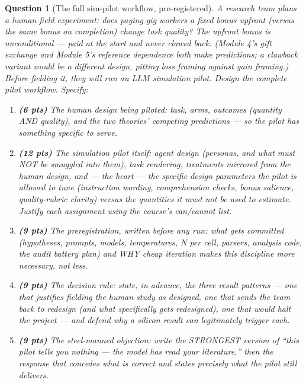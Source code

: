 \documentclass[11pt]{article}
\newtheorem{question}{Question}
\begin{document}
\begin{question}[The full sim-pilot workflow, pre-registered]
A research team plans a human field experiment: \emph{does paying gig
workers a fixed bonus upfront (versus the same bonus on completion)
change task quality?} The upfront bonus is unconditional --- paid at
the start and never clawed back. (Module 4's gift exchange and Module
5's reference dependence both make predictions; a clawback variant
would be a different design, pitting loss framing against gain
framing.) Before fielding it, they
will run an LLM simulation pilot. Design the complete pilot workflow.
Specify:
\begin{enumerate}[label=(\alph*)]
  \item \textbf{(6 pts)} The human design being piloted: task, arms,
        outcomes (quantity AND quality), and the two theories'
        competing predictions --- so the pilot has something specific
        to serve.
  \item \textbf{(12 pts)} The simulation pilot itself: agent design
        (personas, and what must NOT be smuggled into them), task
        rendering, treatments mirrored from the human design, and ---
        the heart --- the specific design parameters the pilot is
        allowed to tune (instruction wording, comprehension checks,
        bonus salience, quality-rubric clarity) versus the quantities
        it must not be used to estimate. Justify each assignment
        using the course's can/cannot list.
  \item \textbf{(9 pts)} The preregistration, written before any run:
        what gets committed (hypotheses, prompts, models,
        temperatures, N per cell, parsers, analysis code, the audit
        battery plan) and WHY cheap iteration makes this discipline
        more necessary, not less.
  \item \textbf{(9 pts)} The decision rule: state, in advance, the
        three result patterns --- one that justifies fielding the
        human study as designed, one that sends the team back to
        redesign (and what specifically gets redesigned), one that
        would halt the project --- and defend why a silicon result
        can legitimately trigger each.
  \item \textbf{(9 pts)} The steel-manned objection: write the
        STRONGEST version of ``this pilot tells you nothing --- the
        model has read your literature,'' then the response that
        concedes what is correct and states precisely what the pilot
        still delivers.
\end{enumerate}
\end{question}
\end{document}
